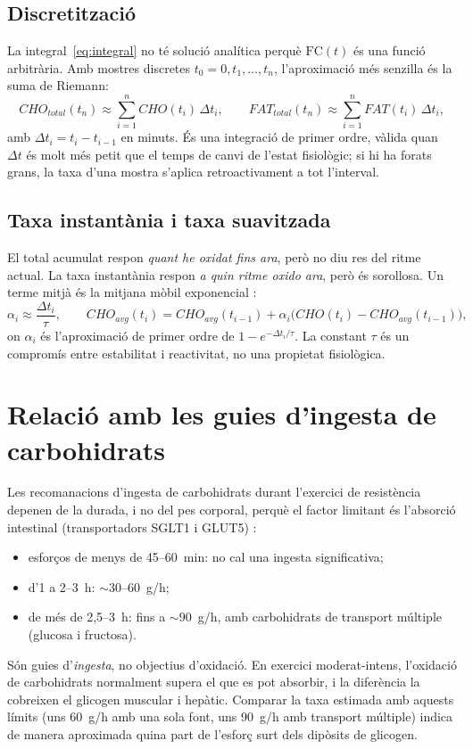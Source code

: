 \documentclass[10pt,a4paper]{article}
\newcommand{\FC}{\ensuremath{\mathrm{FC}}}
\begin{document}
\subsection{Discretització}
La integral~\eqref{eq:integral} no té solució analítica perquè $\FC(t)$ és una
funció arbitrària. Amb mostres discretes $t_0=0,t_1,\dots,t_n$, l'aproximació més
senzilla és la suma de Riemann:
\begin{equation}
  CHO_{total}(t_n)\approx\sum_{i=1}^{n}CHO(t_i)\,\Delta t_i, \qquad
  FAT_{total}(t_n)\approx\sum_{i=1}^{n}FAT(t_i)\,\Delta t_i,
\end{equation}
amb $\Delta t_i=t_i-t_{i-1}$ en minuts. És una integració de primer ordre, vàlida
quan $\Delta t$ és molt més petit que el temps de canvi de l'estat fisiològic; si
hi ha forats grans, la taxa d'una mostra s'aplica retroactivament a tot l'interval.

\subsection{Taxa instantània i taxa suavitzada}
El total acumulat respon \emph{quant he oxidat fins ara}, però no diu res del ritme
actual. La taxa instantània respon \emph{a quin ritme oxido ara}, però és sorollosa.
Un terme mitjà és la mitjana mòbil exponencial \citep{hunter1986}:
\begin{equation}
  \alpha_i\approx\frac{\Delta t_i}{\tau},\qquad
  CHO_{avg}(t_i)=CHO_{avg}(t_{i-1})+\alpha_i\bigl(CHO(t_i)-CHO_{avg}(t_{i-1})\bigr),
\end{equation}
on $\alpha_i$ és l'aproximació de primer ordre de $1-e^{-\Delta t_i/\tau}$. La
constant $\tau$ és un compromís entre estabilitat i reactivitat, no una propietat
fisiològica.

\section{Relació amb les guies d'ingesta de carbohidrats}\label{sec:fueling}

Les recomanacions d'ingesta de carbohidrats durant l'exercici de resistència
depenen de la durada, i no del pes corporal, perquè el factor limitant és
l'absorció intestinal (transportadors SGLT1 i GLUT5) \citep{jeukendrup2014}:
\begin{itemize}
  \item esforços de menys de 45--60~min: no cal una ingesta significativa;
  \item d'1 a 2--3~h: $\sim30$--60~g/h;
  \item de més de 2,5--3~h: fins a $\sim90$~g/h, amb carbohidrats de transport
        múltiple (glucosa i fructosa).
\end{itemize}
Són guies d'\emph{ingesta}, no objectius d'oxidació. En exercici moderat-intens,
l'oxidació de carbohidrats normalment supera el que es pot absorbir, i la diferència
la cobreixen el glicogen muscular i hepàtic. Comparar la taxa estimada amb aquests
límits (uns 60~g/h amb una sola font, uns 90~g/h amb transport múltiple) indica de
manera aproximada quina part de l'esforç surt dels dipòsits de glicogen.
\end{document}

